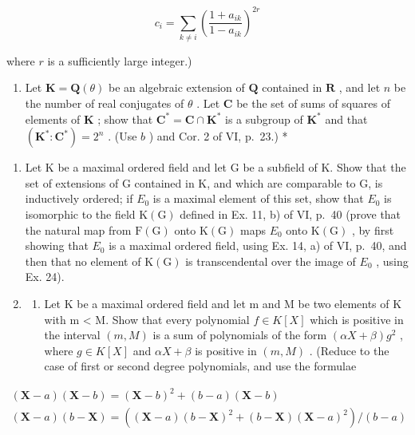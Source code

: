 \[
c _ {i} = \sum_ {k \neq i} \left(\frac {1 + a _ {i k}}{1 - a _ {i k}}\right) ^ {2 r}
\]

where \(r\) is a sufficiently large integer.)

\begin{enumerate}
\def\labelenumi{\alph{enumi})}
\setcounter{enumi}{2}
\tightlist
\item
  Let \(\mathbf{K} = \mathbf{Q}(\theta)\) be an algebraic extension of \(\mathbf{Q}\) contained in \(\mathbf{R}\) , and let \(n\) be the number of real conjugates of \(\theta\) . Let \(\mathbf{C}\) be the set of sums of squares of elements of \(\mathbf{K}\) ; show that \(\mathbf{C}^* = \mathbf{C} \cap \mathbf{K}^*\) is a subgroup of \(\mathbf{K}^*\) and that \((\mathbf{K}^*: \mathbf{C}^*) = 2^n\) . (Use \(b\) ) and Cor. 2 of VI, p.~23.) *
\end{enumerate}

\begin{enumerate}
\def\labelenumi{\arabic{enumi})}
\setcounter{enumi}{28}
\item
  Let K be a maximal ordered field and let G be a subfield of K. Show that the set of extensions of G contained in K, and which are comparable to G, is inductively ordered; if \(E_{0}\) is a maximal element of this set, show that \(E_{0}\) is isomorphic to the field \(\mathrm{K}(\mathrm{G})\) defined in Ex. 11, b) of VI, p.~40 (prove that the natural map from \(\mathrm{F}(\mathrm{G})\) onto \(\mathrm{K}(\mathrm{G})\) maps \(E_{0}\) onto \(\mathrm{K}(\mathrm{G})\) , by first showing that \(E_{0}\) is a maximal ordered field, using Ex. 14, a) of VI, p.~40, and then that no element of \(\mathrm{K}(\mathrm{G})\) is transcendental over the image of \(E_{0}\) , using Ex. 24).
\item
  \begin{enumerate}
  \def\labelenumii{\alph{enumii})}
  \tightlist
  \item
    Let K be a maximal ordered field and let m and M be two elements of K with m \textless{} M. Show that every polynomial \(f \in K[X]\) which is positive in the interval \((m, M)\) is a sum of polynomials of the form \((\alpha X + \beta) g^{2}\) , where \(g \in K[X]\) and \(\alpha X + \beta\) is positive in \((m, M)\) . (Reduce to the case of first or second degree polynomials, and use the formulae
  \end{enumerate}
\end{enumerate}

\[
\begin{array}{l} (\mathbf {X} - a) (\mathbf {X} - b) = (\mathbf {X} - b) ^ {2} + (b - a) (\mathbf {X} - b) \\ (\mathbf {X} - a) (b - \mathbf {X}) = ((\mathbf {X} - a) (b - \mathbf {X}) ^ {2} + (b - \mathbf {X}) (\mathbf {X} - a) ^ {2}) / (b - a) \end{array}
\]

